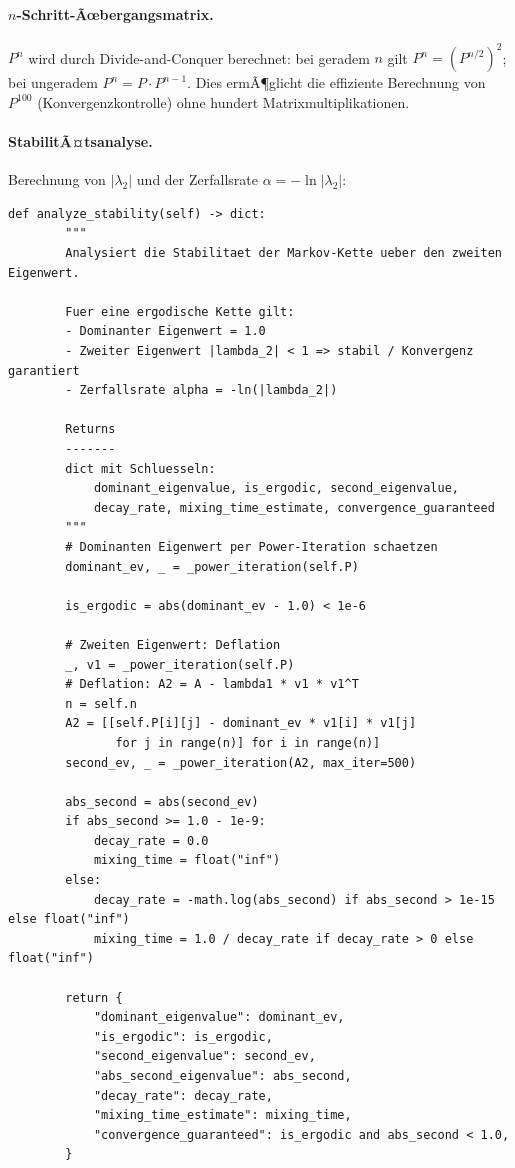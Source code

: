 ﻿\documentclass[a4paper,12pt]{report}
\theoremstyle{definition}
\begin{document}
\paragraph{$n$-Schritt-Ãœbergangsmatrix.}
$P^n$ wird durch Divide-and-Conquer berechnet: bei geradem $n$ gilt
$P^n = (P^{n/2})^2$; bei ungeradem $P^n = P \cdot P^{n-1}$. Dies ermÃ¶glicht
die effiziente Berechnung von $P^{100}$ (Konvergenzkontrolle) ohne
hundert Matrixmultiplikationen.

\paragraph{StabilitÃ¤tsanalyse.}
Berechnung von $|\lambda_2|$ und der Zerfallsrate $\alpha = -\ln|\lambda_2|$:

\begin{lstlisting}[style=python, caption={StabilitÃ¤tsanalyse: Zerfallsrate und Mixing-Zeit}, label=lst:stability-impl]
def analyze_stability(self) -> dict:
        """
        Analysiert die Stabilitaet der Markov-Kette ueber den zweiten Eigenwert.

        Fuer eine ergodische Kette gilt:
        - Dominanter Eigenwert = 1.0
        - Zweiter Eigenwert |lambda_2| < 1 => stabil / Konvergenz garantiert
        - Zerfallsrate alpha = -ln(|lambda_2|)

        Returns
        -------
        dict mit Schluesseln:
            dominant_eigenvalue, is_ergodic, second_eigenvalue,
            decay_rate, mixing_time_estimate, convergence_guaranteed
        """
        # Dominanten Eigenwert per Power-Iteration schaetzen
        dominant_ev, _ = _power_iteration(self.P)

        is_ergodic = abs(dominant_ev - 1.0) < 1e-6

        # Zweiten Eigenwert: Deflation
        _, v1 = _power_iteration(self.P)
        # Deflation: A2 = A - lambda1 * v1 * v1^T
        n = self.n
        A2 = [[self.P[i][j] - dominant_ev * v1[i] * v1[j]
               for j in range(n)] for i in range(n)]
        second_ev, _ = _power_iteration(A2, max_iter=500)

        abs_second = abs(second_ev)
        if abs_second >= 1.0 - 1e-9:
            decay_rate = 0.0
            mixing_time = float("inf")
        else:
            decay_rate = -math.log(abs_second) if abs_second > 1e-15 else float("inf")
            mixing_time = 1.0 / decay_rate if decay_rate > 0 else float("inf")

        return {
            "dominant_eigenvalue": dominant_ev,
            "is_ergodic": is_ergodic,
            "second_eigenvalue": second_ev,
            "abs_second_eigenvalue": abs_second,
            "decay_rate": decay_rate,
            "mixing_time_estimate": mixing_time,
            "convergence_guaranteed": is_ergodic and abs_second < 1.0,
        }
\end{lstlisting}
\end{document}

